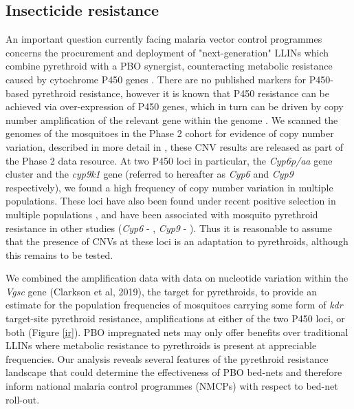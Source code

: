 \documentclass[a4paper,11pt,abstracton,hidelinks]{scrartcl}
\begin{document}
\subsection*{Insecticide resistance}

%
An important question currently facing malaria vector control programmes concerns the procurement and deployment of "next-generation" LLINs which combine pyrethroid with a PBO synergist, counteracting metabolic resistance caused by cytochrome P450 genes \cite{churcher2016, killeen2018, toe2018}.
%
There are no published markers for P450-based pyrethroid resistance, however it is known that P450 resistance can be achieved via over-expression of P450 genes, which in turn can be driven by copy number amplification of the relevant gene within the genome \cite{riveron2014, muller2008}.
%
We scanned the genomes of the mosquitoes in the Phase 2 cohort for evidence of copy number variation, described in more detail in \cite{lucas2019}, these CNV results are released as part of the Phase 2 data resource.
%
At two P450 loci in particular, the \textit{Cyp6p/aa} gene cluster and the \textit{cyp9k1} gene (referred to hereafter as \textit{Cyp6} and \textit{Cyp9} respectively), we found a high frequency of copy number variation in multiple populations.
%
These loci have also been found under recent positive selection in multiple populations \cite{Ag1000gConsortium2017}, and have been associated with mosquito pyrethroid resistance in other studies (\textit{Cyp6} - \cite{nikou2003, edi2014, faucon2015, main2018}, \textit{Cyp9} - \cite{main2018, tchigossou2018, vontas2018}).
%
Thus it is reasonable to assume that the presence of CNVs at these loci is an adaptation to pyrethroids, although this remains to be tested.


We combined the amplification data with data on nucleotide variation within the \textit{Vgsc} gene (Clarkson et al, 2019), the target for pyrethroids, to provide an estimate for the population frequencies of mosquitoes carrying some form of \textit{kdr} target-site pyrethroid resistance, amplifications at either of the two P450 loci, or both (Figure \ref{ir}). 
%
PBO impregnated nets may only offer benefits over traditional LLINs where metabolic resistance to pyrethroids is present at appreciable frequencies.
%
Our analysis reveals several features of the pyrethroid resistance landscape that could determine the effectiveness of PBO bed-nets and therefore inform national malaria control programmes (NMCPs) with respect to bed-net roll-out.
\end{document}
